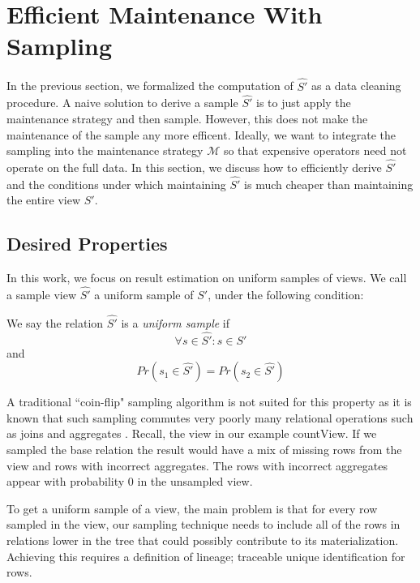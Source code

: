 \section{Efficient Maintenance With Sampling} \label{sampling}
In the previous section, we formalized the computation of $\hat{S'}$  as a data cleaning procedure.
A naive solution to derive a sample $\hat{S'}$ is to just apply the maintenance strategy and then sample.
However, this does not make the maintenance of the sample any more efficent.
Ideally, we want to integrate the sampling into the maintenance strategy $\mathcal{M}$ so that expensive operators
need not operate on the full data.
In this section, we discuss how to efficiently derive $\hat{S'}$ and the conditions under which
maintaining $\hat{S'}$ is much cheaper than maintaining the entire view $S'$.

\subsection{Desired Properties}
In this work, we focus on result estimation on uniform samples of views.
We call a sample view $\hat{S'}$ a uniform sample of $S'$, under the following condition:
\begin{definition} We say the relation $\hat{S'}$ is a \emph{uniform sample} if
\[ \forall s \in \hat{S'} : s \in S' \]
and
\[Pr(s_1 \in \hat{S'}) =  Pr(s_2 \in \hat{S'}) \]
\end{definition}
A traditional ``coin-flip" sampling algorithm is not suited for this property as it is known that such sampling commutes very poorly many relational operations such as joins and aggregates \cite{chaudhuri1999random}.
Recall, the view in our example \textsf{countView}. 
If we sampled the base relation the result would have a mix of missing rows from the view and rows with incorrect aggregates.
The rows with incorrect aggregates appear with probability 0 in the unsampled view.

To get a uniform sample of a view, the main problem is that for every row sampled in the view, our sampling technique needs to include all of the rows in relations lower in the tree that could possibly contribute to its materialization.
Achieving this requires a definition of lineage; traceable unique identification for rows.

